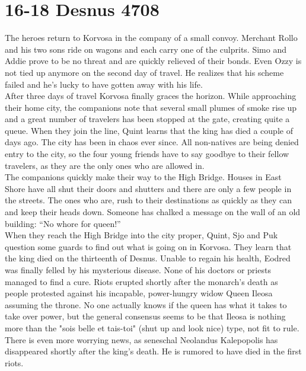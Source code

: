 \section{16-18 Desnus 4708}

The heroes return to Korvosa in the company of a small convoy. Merchant Rollo and his two sons ride on wagons and each carry one of the culprits. Simo and Addie prove to be no threat and are quickly relieved of their bonds. Even Ozzy is not tied up anymore on the second day of travel. He realizes that his scheme failed and he's lucky to have gotten away with his life.\\

After three days of travel Korvosa finally graces the horizon. While approaching their home city, the companions note that several small plumes of smoke rise up and a great number of travelers has been stopped at the gate, creating quite a queue. When they join the line, Quint learns that the king has died a couple of days ago. The city has been in chaos ever since. All non-natives are being denied entry to the city, so the four young friends have to say goodbye to their fellow travelers, as they are the only ones who are allowed in.\\

The companions quickly make their way to the High Bridge. Houses in East Shore have all shut their doors and shutters and there are only a few people in the streets. The ones who are, rush to their destinations as quickly as they can and keep their heads down. Someone has chalked a message on the wall of an old building: ``No whore for queen!''\\

When they reach the High Bridge into the city proper, Quint, Sjo and Puk question some guards to find out what is going on in Korvosa. They learn that the king died on the thirteenth of Desnus. Unable to regain his health, Eodred was finally felled by his mysterious disease. None of his doctors or priests managed to find a cure. Riots erupted shortly after the monarch's death as people protested against his incapable, power-hungry widow Queen Ileosa assuming the throne. No one actually knows if the queen has what it takes to take over power, but the general consensus seems to be that Ileosa is nothing more than the "sois belle et tais-toi" (shut up and look nice) type, not fit to rule. There is even more worrying news, as seneschal Neolandus Kalepopolis has disappeared shortly after the king's death. He is rumored to have died in the first riots.\\

